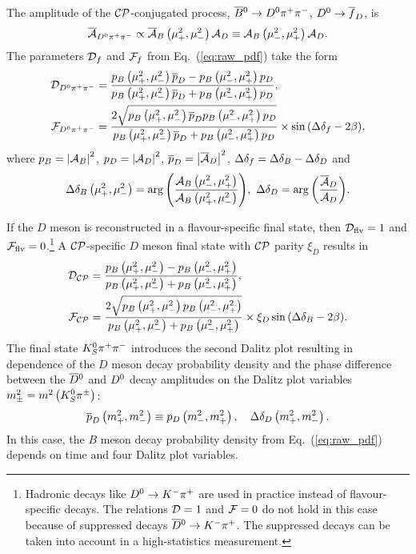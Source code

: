 \documentclass[a4paper,11pt]{article}
\begin{document}
The amplitude of the $\mathcal{CP}$-conjugated process, $\overline{B}{}^0\to D^0\pi^+\pi^-$, 
$D^0\to\overline{f}_D$, is
\begin{equation}
 \overline{\mathcal{A}}{}_{D^0\pi^+\pi^-} \propto \overline{\mathcal{A}}_B\left(\mu^2_{+},\mu^2_{-}\right)\mathcal{A}_D\equiv\mathcal{A}_B\left(\mu^2_{-},\mu^2_{+}\right)\mathcal{A}_D.
\end{equation}
The parameters $\mathcal{D}_f$ and $\mathcal{F}_f$ from Eq.~(\ref{eq:raw_pdf}) 
take the form
\begin{subequations}\label{eq:y}
 \begin{align}
  \label{eq:y:1}
  \mathcal{D}_{D^0\pi^+\pi^-} &=
    \frac{p_B\left(\mu^2_{+},\mu^2_{-}\right)\overline{p}_D - p_B\left(\mu^2_{-},\mu^2_{+}\right) p_D}
         {p_B\left(\mu^2_{+},\mu^2_{-}\right)\overline{p}_D + p_B\left(\mu^2_{-},\mu^2_{+}\right) p_D}, \\ 
  \label{eq:y:2}
  \mathcal{F}_{D^0\pi^+\pi^-} &=
    \frac{2\sqrt{p_B\left(\mu^2_{+},\mu^2_{-}\right)\overline{p}_Dp_B\left(\mu^2_{-},\mu^2_{+}\right) p_D}}
         {p_B\left(\mu^2_{+},\mu^2_{-}\right)\overline{p}_D + p_B\left(\mu^2_{-},\mu^2_{+}\right) p_D}\times\sin{\left(\Delta\delta_f-2\beta\right)},
 \end{align}
\end{subequations}
where $p_B = \left|\mathcal{A}_B\right|^2$, $p_D = \left|\mathcal{A}_D\right|^2$, 
$\overline{p}_D = \left|\overline{\mathcal{A}}_D\right|^2$, $\Delta\delta_f = \Delta\delta_B - \Delta\delta_D$ and
\begin{equation}\label{eq:phases-definition}
 \delb\bvar = \arg{\left(\frac{\ab\bvarinv}{\ab\bvar}\right)},\ 
 \deld = \arg{\left(\frac{\adbar}{\ad}\right)}.
\end{equation}

If the $D$ meson is reconstructed in a flavour-specific final state, then 
$\mathcal{D}_{\mathrm{flv}} = 1$ and $\mathcal{F}_{\mathrm{flv}} = 0$.\footnote{Hadronic decays like 
$D^0\to K^-\pi^+$ are used in practice instead of flavour-specific decays.  
The relations $\mathcal{D} = 1$ and $\mathcal{F} = 0$ do not hold in this case 
because of suppressed decays $\overline{D}{}^0\to K^-\pi^+$.  The suppressed decays 
can be taken into account in a high-statistics measurement.} 
A $\mathcal{CP}$-specific $D$ meson final 
state with $\mathcal{CP}$ parity $\xi_D$ results in
\begin{subequations}\label{eq:raw_pdf_cp}
 \begin{align}
  \mathcal{D}_{\mathcal{CP}} & =  \frac{p_B\left(\mu^2_{+},\mu^2_{-}\right) - p_B\left(\mu^2_{-},\mu^2_{+}\right)}{p_B\left(\mu^2_{+},\mu^2_{-}\right) + p_B\left(\mu^2_{-},\mu^2_{+}\right)}, \\ 
  \mathcal{F}_{\mathcal{CP}} & =  \frac{2\sqrt{p_B\left(\mu^2_{+},\mu^2_{-}\right) p_B\left(\mu^2_{-},\mu^2_{+}\right)}}
                          {p_B\left(\mu^2_{+},\mu^2_{-}\right) + p_B\left(\mu^2_{-},\mu^2_{+}\right)}\times \xi_D \sin{(\Delta\delta_B-2\beta)}.
 \end{align}
\end{subequations}
The final state $K_S^0\pi^+\pi^-$ introduces the second Dalitz plot resulting in 
dependence of the $D$ meson decay probability density and the phase difference 
between the $\overline{D}{}^0$ and $D^0$ decay amplitudes on the Dalitz plot variables 
$m_{\pm}^2 = m^2\left(K_S^0\pi^{\pm}\right)$:
\begin{equation}\label{eq:dcpcons}
 \overline{p}_D\left(m_+^2,m_-^2\right) \equiv p_D\left(m_-^2,m_+^2\right),\quad \Delta\delta_D\left(m_+^2,m_-^2\right).
\end{equation}
In this case, the $B$ meson decay probability density from Eq.~(\ref{eq:raw_pdf}) 
depends on time and four Dalitz plot variables.
\end{document}
